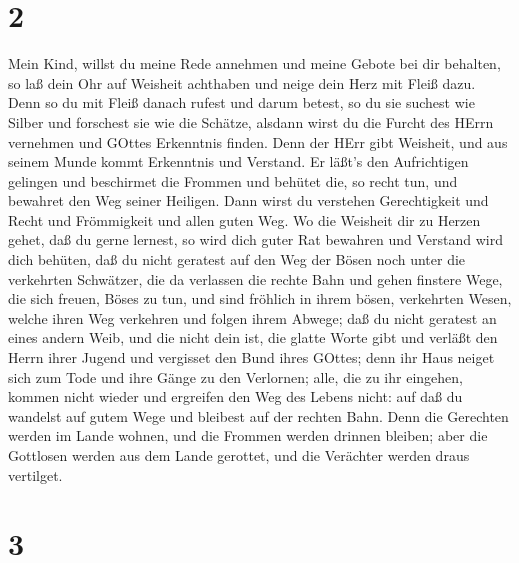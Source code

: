 \hypertarget{section-1}{%
\section{2}\label{section-1}}

 Mein Kind, willst du meine Rede annehmen und meine Gebote
bei dir behalten,  so laß dein Ohr auf Weisheit achthaben
und neige dein Herz mit Fleiß dazu.  Denn so du mit Fleiß
danach rufest und darum betest,  so du sie suchest wie
Silber und forschest sie wie die Schätze,  alsdann wirst du
die Furcht des HErrn vernehmen und GOttes Erkenntnis finden.
 Denn der HErr gibt Weisheit, und aus seinem Munde kommt
Erkenntnis und Verstand.  Er läßt's den Aufrichtigen
gelingen und beschirmet die Frommen  und behütet die, so
recht tun, und bewahret den Weg seiner Heiligen.  Dann wirst
du verstehen Gerechtigkeit und Recht und Frömmigkeit und allen guten
Weg.  Wo die Weisheit dir zu Herzen gehet, daß du gerne
lernest,  so wird dich guter Rat bewahren und Verstand wird
dich behüten,  daß du nicht geratest auf den Weg der Bösen
noch unter die verkehrten Schwätzer,  die da verlassen die
rechte Bahn und gehen finstere Wege,  die sich freuen,
Böses zu tun, und sind fröhlich in ihrem bösen, verkehrten Wesen,
 welche ihren Weg verkehren und folgen ihrem Abwege;
 daß du nicht geratest an eines andern Weib, und die nicht
dein ist, die glatte Worte gibt  und verläßt den Herrn
ihrer Jugend und vergisset den Bund ihres GOttes;  denn ihr
Haus neiget sich zum Tode und ihre Gänge zu den Verlornen; 
alle, die zu ihr eingehen, kommen nicht wieder und ergreifen den Weg des
Lebens nicht:  auf daß du wandelst auf gutem Wege und
bleibest auf der rechten Bahn.  Denn die Gerechten werden
im Lande wohnen, und die Frommen werden drinnen bleiben; 
aber die Gottlosen werden aus dem Lande gerottet, und die Verächter
werden draus vertilget.

\hypertarget{section-2}{%
\section{3}\label{section-2}}

